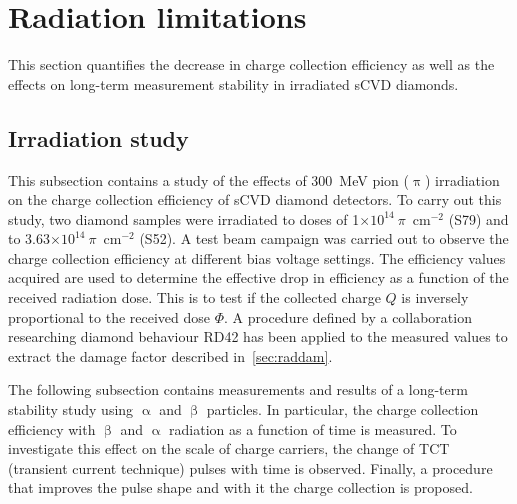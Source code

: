 \clearpage
\section{Radiation limitations}
\label{sec:radlimit}
This section quantifies the decrease in charge collection efficiency as well as the effects on long-term measurement stability in irradiated sCVD diamonds.


\subsection{Irradiation study}
This subsection contains a study of the effects of 300~MeV pion ($\uppi$) irradiation on the charge collection efficiency of sCVD diamond detectors. To carry out this study, two diamond samples were irradiated to doses of 1$\times10^{14}~\pi$~cm$^{-2}$ (S79) and to 3.63$\times10^{14}~\pi$~cm$^{-2}$ (S52). A test beam campaign was carried out to observe the charge collection efficiency at different bias voltage settings. The efficiency values acquired are used to determine the effective drop in efficiency as a function of the received radiation dose. This is to test if the collected charge $Q$ is inversely proportional to the received dose $\Phi$. A procedure defined by a collaboration researching diamond behaviour RD42 has been applied to the measured values to extract the damage factor described in~\ref{sec:raddam}.

The following subsection contains measurements and results of a long-term stability study using $\upalpha$ and $\upbeta$ particles. In particular, the charge collection efficiency with $\upbeta$ and $\upalpha$ radiation as a function of time is measured. To investigate this effect on the scale of charge carriers, the change of TCT (transient current technique) pulses with time is observed. Finally, a procedure that improves the pulse shape and with it the charge collection is proposed.



